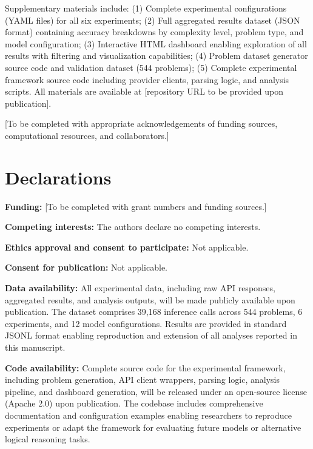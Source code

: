\documentclass[pdflatex,sn-mathphys-num]{sn-jnl}%
\theoremstyle{thmstyleone}%
\theoremstyle{thmstyletwo}%
\theoremstyle{thmstylethree}%
\begin{document}
\backmatter


Supplementary materials include: (1) Complete experimental configurations (YAML files) for all six experiments; (2) Full aggregated results dataset (JSON format) containing accuracy breakdowns by complexity level, problem type, and model configuration; (3) Interactive HTML dashboard enabling exploration of all results with filtering and visualization capabilities; (4) Problem dataset generator source code and validation dataset (544 problems); (5) Complete experimental framework source code including provider clients, parsing logic, and analysis scripts. All materials are available at [repository URL to be provided upon publication].


[To be completed with appropriate acknowledgements of funding sources, computational resources, and collaborators.]

\section*{Declarations}

\textbf{Funding:} [To be completed with grant numbers and funding sources.]

\textbf{Competing interests:} The authors declare no competing interests.

\textbf{Ethics approval and consent to participate:} Not applicable.

\textbf{Consent for publication:} Not applicable.

\textbf{Data availability:} All experimental data, including raw API responses, aggregated results, and analysis outputs, will be made publicly available upon publication. The dataset comprises 39,168 inference calls across 544 problems, 6 experiments, and 12 model configurations. Results are provided in standard JSONL format enabling reproduction and extension of all analyses reported in this manuscript.

\textbf{Code availability:} Complete source code for the experimental framework, including problem generation, API client wrappers, parsing logic, analysis pipeline, and dashboard generation, will be released under an open-source license (Apache 2.0) upon publication. The codebase includes comprehensive documentation and configuration examples enabling researchers to reproduce experiments or adapt the framework for evaluating future models or alternative logical reasoning tasks.
\end{document}
